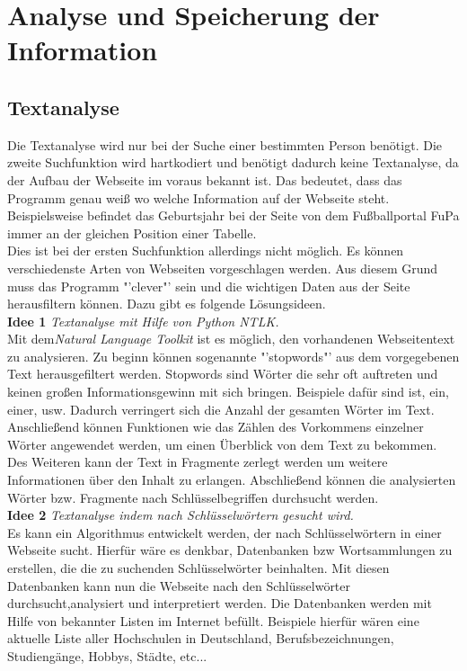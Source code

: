 \section{Analyse und Speicherung der Information}
	\subsection{Textanalyse}
	Die Textanalyse wird nur bei der Suche einer bestimmten Person benötigt. Die  zweite Suchfunktion wird hartkodiert und benötigt dadurch keine Textanalyse, da der Aufbau der Webseite im voraus bekannt ist. Das bedeutet, dass das Programm genau weiß wo welche Information auf der Webseite steht. Beispielsweise befindet das Geburtsjahr bei der Seite von dem Fußballportal FuPa immer an der gleichen Position einer Tabelle.\\
	Dies ist bei der ersten Suchfunktion allerdings nicht möglich. Es können verschiedenste Arten von Webseiten vorgeschlagen werden. Aus diesem Grund muss das Programm "'clever"' sein und die wichtigen Daten aus der Seite herausfiltern können. Dazu gibt es folgende Lösungsideen.\\
	
	{\bf Idee 1} \textit{Textanalyse mit Hilfe von Python NTLK.}\\
	Mit dem\textit{Natural Language Toolkit} ist es möglich, den vorhandenen Webseitentext zu analysieren. Zu beginn können sogenannte "'stopwords"' aus dem vorgegebenen Text herausgefiltert werden. Stopwords sind Wörter die sehr oft auftreten und keinen großen Informationsgewinn mit sich bringen. Beispiele dafür sind ist, ein, einer, usw. Dadurch verringert sich die Anzahl der gesamten Wörter im Text. Anschließend können Funktionen wie das Zählen des Vorkommens einzelner Wörter angewendet werden, um einen Überblick von dem Text zu bekommen. Des Weiteren kann der Text in Fragmente zerlegt werden um weitere Informationen über den Inhalt zu erlangen. Abschließend können die analysierten Wörter bzw. Fragmente nach Schlüsselbegriffen durchsucht werden.\\
	
	{\bf Idee 2} \textit{Textanalyse indem nach Schlüsselwörtern gesucht wird.}\\
	Es kann ein Algorithmus entwickelt werden, der nach Schlüsselwörtern in einer Webseite sucht. Hierfür wäre es denkbar, Datenbanken bzw Wortsammlungen zu erstellen, die die zu suchenden Schlüsselwörter beinhalten. Mit diesen Datenbanken kann nun die Webseite nach den Schlüsselwörter durchsucht,analysiert und interpretiert werden. Die Datenbanken werden mit Hilfe von bekannter Listen im Internet befüllt. Beispiele hierfür wären eine aktuelle Liste aller Hochschulen in Deutschland, Berufsbezeichnungen, Studiengänge, Hobbys, Städte, etc...\\
	

